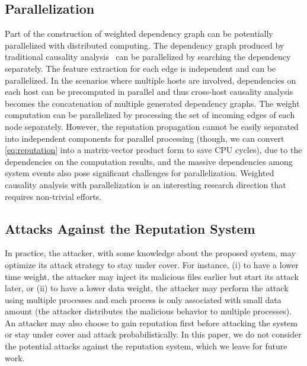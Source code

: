 \subsection{Parallelization}
Part of the construction of weighted dependency graph can be potentially parallelized with distributed computing. 
The dependency graph produced by traditional causality analysis~\cite{backtracking,backtracking2} can be parallelized by
searching the dependency separately.
The feature extraction for each edge is independent and 
can be parallelized.
In the scenarios where multiple hosts are involved, dependencies on each host can be precomputed in parallel and thus cross-host causality analysis becomes the concatenation of multiple generated dependency graphs. 
The weight computation can be parallelized by processing the set of incoming edges of each node separately.
However, the reputation propagation cannot be easily separated into independent components for parallel processing
(though, we can convert \cref{eq:reputation} into a matrix-vector product form to save CPU cycles), due to the dependencies on the computation results, 
and the massive dependencies among system events also pose significant challenges for parallelization.
Weighted causality analysis with parallelization is an interesting research direction that requires non-trivial efforts.

\subsection{Attacks Against the Reputation System}
In practice, the attacker, with some knowledge about the proposed system, may optimize its attack strategy to stay under cover. For instance, (i) to have a lower time weight, the attacker may inject its malicious files earlier but start its attack later, or (ii) to have a lower data weight, the attacker may perform the attack using multiple processes and each process is only associated with small data amount (\ie the attacker distributes the malicious behavior to multiple processes). An attacker may also choose to gain reputation first before attacking the system or stay under cover and attack probabilistically. 
In this paper, we do not consider the potential attacks against the reputation system, which we leave for future work.



